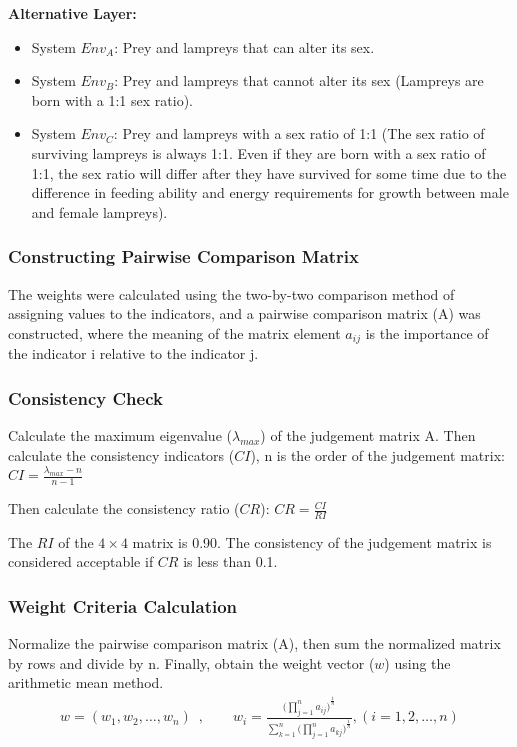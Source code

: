 \documentclass{mcmthesis}
\begin{document}
\textbf{Alternative Layer:}

\begin{itemize}
    \item System $Env_{A}$: Prey and lampreys that can alter its sex. 

    \item System $Env_{B}$: Prey and lampreys that cannot alter its sex (Lampreys are born with a 1:1 sex ratio). 

    \item System $Env_{C}$: Prey and lampreys with a sex ratio of 1:1 (The sex ratio of surviving lampreys is always 1:1. Even if they are born with a sex ratio of 1:1, the sex ratio will differ after they have survived for some time due to the difference in feeding ability and energy requirements for growth between male and female lampreys). 
\end{itemize}

\subsubsection{Constructing Pairwise Comparison Matrix}
The weights were calculated using the two-by-two comparison method of assigning values to the indicators, and a pairwise comparison matrix (A) was constructed, where the meaning of the matrix element $a_{ij}$ is the importance of the indicator i relative to the indicator j. 

\subsubsection{Consistency Check}
Calculate the maximum eigenvalue ($\lambda_{max}$) of the judgement matrix A. Then calculate the consistency indicators ($CI$), n is the order of the judgement matrix: $ CI=\frac{\lambda_{max}-n}{n-1} $

Then calculate the consistency ratio ($CR$): $ CR=\frac{CI}{RI} $

The $RI$ of the $4 \times 4$ matrix is 0.90. The consistency of the judgement matrix is considered acceptable if $CR$ is less than 0.1.

\subsubsection{Weight Criteria Calculation}
Normalize the pairwise comparison matrix (A), then sum the normalized matrix by rows and divide by n. Finally, obtain the weight vector ($w$) using the arithmetic mean method.
\begin{align}
w=(w_1,w_2,\ldots,w_n)\,\,\,, \quad\quad w_i=\frac{({\prod_{j=1}^{n}a_{ij})}^\frac{1}{n}}{\sum_{k=1}^{n}{({\prod_{j=1}^{n}a_{kj})}^\frac{1}{n}}},\left(i=1,2,\ldots,n\right)
\end{align}
\end{document}
